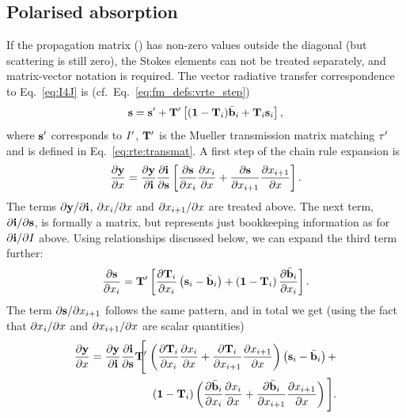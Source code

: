 \subsection{Polarised absorption}
%
If the propagation matrix (\ExtMat) has non-zero values outside the diagonal
(but scattering is still zero), the Stokes elements can not be treated
separately, and matrix-vector notation is required. The vector radiative
transfer correspondence to Eq.~\ref{eq:I4J} is
(cf.~Eq.~\ref{eq:fm_defs:vrte_step})
\begin{equation}
  \label{eq:s4J}
  {\bf s} = {\bf s}' + \mathbf{T}' \left[ (\mathbf{1}-\mathbf{T}_{i})\bar{{\bf b}}_i +
      \mathbf{T}_{i} {\bf s}_{i} \right],
\end{equation}
where ${\bf s}'$ corresponds to $I'$, $\mathbf{T}'$ is the Mueller
transmission matrix matching $\tau'$ and  is defined in
Eq.~\ref{eq:rte:transmat}. A first step of the chain rule expansion is
\begin{equation}
  \label{eq:chainrule2}
  \frac{\partial\mathbf{y}}{\partial x} =  
  \frac{\partial\mathbf{y}}{\partial\mathbf{i}}
  \frac{\partial\mathbf{i}}{\partial{\bf s}} 
  \left[ \frac{\partial{\bf s}}{\partial x_{i}}
         \frac{\partial x_{i}}{\partial x} +
         \frac{\partial{\bf s}}{\partial x_{i+1}}
         \frac{\partial x_{i+1}}{\partial x} 
  \right].
\end{equation}
The terms $\partial\mathbf{y}/\partial\mathbf{i}$, $\partial x_{i}/\partial x$
and $\partial x_{i+1}/\partial x$ are treated above. The next term,
$\partial\mathbf{i}/\partial{\bf s}$, is formally a matrix, but represents just
bookkeeping information as for $\partial\mathbf{i}/\partial I$ above. Using
relationships discussed below, we can expand the third term further:
\begin{equation}
  \frac{\partial{\bf s}}{\partial x_{i}} = \mathbf{T}'
  \left[
    \frac{\partial\mathbf{T}_{i}}{\partial x_{i}}
      \left( {\bf s}_{i}-\bar{{\bf b}}_i \right) +
    \left( \mathbf{1}-\mathbf{T}_{i} \right) 
      \frac{\partial\bar{{\bf b}}_i}{\partial x_{i}}
  \right].
\end{equation}
The term $\partial{\bf s}/\partial x_{i+1}$ follows the same pattern, and in
total we get (using the fact that $\partial x_{i}/\partial x$ and
$\partial x_{i+1}/\partial x$ are scalar quantities)
\begin{eqnarray}
  \frac{\PartD\MsrVct}{\PartD\SttElm} =  
  \frac{\PartD\MsrVct}{\PartD\MpiVct}
  \frac{\PartD\MpiVct}{\PartD\StoVec} \TrnMat'
  \!\!\!\!&\Bigg[&\!\!\!\!
    \left( 
      \frac{\PartD\aTrnMat{i}}{\PartD\aSttElm{i}}
      \frac{\PartD\aSttElm{i}}{\PartD\SttElm} +
      \frac{\PartD\aTrnMat{i}}{\PartD\aSttElm{i+1}}
      \frac{\PartD\aSttElm{i+1}}{\PartD\SttElm}
    \right)
    \left( \aStoVec{i}-\bar{\EmsVec}_i \right) + \nonumber\\ && \!\!\!
    \left( \IdnMtr-\aTrnMat{i} \right) 
    \left(
      \frac{\PartD\bar{\EmsVec}_i}{\PartD\aSttElm{i}} 
      \frac{\PartD\aSttElm{i}}{\PartD\SttElm} +
      \frac{\PartD\bar{\EmsVec}_i}{\PartD\aSttElm{i+1}} 
      \frac{\PartD\aSttElm{i+1}}{\PartD\SttElm}
    \right)
  \Bigg].
\end{eqnarray}
